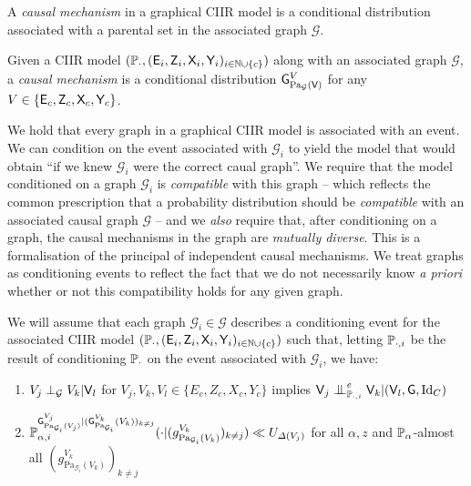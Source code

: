 A \emph{causal mechanism} in a graphical CIIR model is a conditional distribution associated with a parental set in the associated graph $\mathcal{G}$.

\begin{definition}
Given a CIIR model $(\mathbb{P}_\cdot,(\mathsf{E}_i,\mathsf{Z}_{i},\mathsf{X}_i,\mathsf{Y}_i)_{i\in \mathbb{N}\cup\{c\}})$ along with an associated graph $\mathcal{G}$, a \emph{causal mechanism} is a conditional distribution $\mathsf{G}^{V}_{\mathrm{Pa}_{\mathcal{G}}(\mathsf{V})}$ for any $V\in \{\mathsf{E}_c,\mathsf{Z}_c,\mathsf{X}_c,\mathsf{Y}_c\}$.
\end{definition}

We hold that every graph in a graphical CIIR model is associated with an event. We can condition on the event associated with $\mathcal{G}_i$ to yield the model that would obtain ``if we knew $\mathcal{G}_i$ were the correct caual graph''. We require that the model conditioned on a graph $\mathcal{G}_i$ is \emph{compatible} with this graph -- which reflects the common prescription that a probability distribution should be \emph{compatible} with an associated causal graph $\mathcal{G}$\citet[Ch. ~1]{pearl_causality:_2009} -- and we \emph{also} require that, after conditioning on a graph, the causal mechanisms in the graph are \emph{mutually diverse}. This is a formalisation of the principal of independent causal mechanisms. We treat graphs as conditioning events to reflect the fact that we do not necessarily know \emph{a priori} whether or not this compatibility holds for any given graph.

\begin{definition}
We will assume that each graph $\mathcal{G}_i\in \mathscr{G}$ describes a conditioning event for the associated CIIR model $(\mathbb{P}_\cdot,(\mathsf{E}_i,\mathsf{Z}_{i},\mathsf{X}_i,\mathsf{Y}_i)_{i\in \mathbb{N}\cup\{c\}})$ such that, letting $\mathbb{P}_{\cdot,i}$ be the result of conditioning $\mathbb{P}_\cdot$ on the event associated with $\mathcal{G}_i$, we have:
\begin{enumerate}
	\item $V_j\perp_{\mathcal{G}} V_k|\mathsf{V}_l$ for $V_j,V_k,V_l\in \{E_c,Z_c,X_c,Y_c\}$ implies $\RV{V}_j\CI^e_{\prob{P}_{\cdot,i}} \RV{V}_k |(\RV{V}_l,\RV{G},\mathrm{Id}_C)$
	\item $\mathbb{P}_{\alpha,i}^{\mathsf{G}^{V_j}_{\mathrm{Pa}_{\mathcal{G}_i}(V_j)}|(\mathsf{G}^{V_k}_{\mathrm{Pa}_{\mathcal{G}_i}}(V_k))_{k\neq j}}(\cdot|(g^{V_k}_{\mathrm{Pa}_{\mathcal{G}_i}(V_k)})_{k\neq j}) \ll U_{\Delta(V_j)}$ for all $\alpha, z$ and $\mathbb{P}_\alpha$-almost all $(g^{V_k}_{\mathrm{Pa}_{\mathcal{G}_i}(V_k)})_{k\neq j}$
\end{enumerate}
\end{definition}




